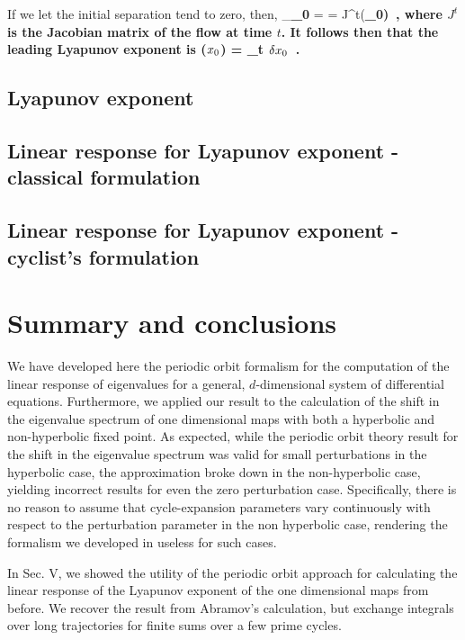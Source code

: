 \documentclass[aps,pre,
                showpacs,
                twocolumn,
                groupedaddress,
                superscriptaddress,
                floatfix]{revtex4-1}
\begin{document}
If we let the initial separation tend to zero, then,
\beq
\lim_{\bf \delta \ssp_{0} } 
= 
= J^{t}(\bf \ssp_{0})
\,,
\eeq
where $J^{t}$ is the Jacobian matrix of the flow at time $t$. It follows
then that the leading Lyapunov exponent is
\beq
\lambda(\textbf{$\ssp_{0}$})
= \lim_{t\rightarrow \infty}
\ln {}
         {\Vert \textbf{$\delta \ssp_{0}$} \Vert}
\,.
\eeq

\subsection{Lyapunov exponent }

\subsection{Linear response for Lyapunov exponent - classical formulation}
\label{sect:LinrespLyapClass}

\subsection{Linear response for Lyapunov exponent - cyclist's formulation}
\label{sect:LinrespLyapCycl}

\section{Summary and conclusions}
\label{sect:concl}

We have developed here the periodic orbit formalism for the computation of the
linear response of eigenvalues for a general, $d$-dimensional system of
differential equations. Furthermore, we applied our result to the
calculation of the shift in the eigenvalue spectrum of one dimensional
maps with both a hyperbolic and non-hyperbolic fixed point. As expected,
while the periodic orbit theory result for the shift in the eigenvalue
spectrum was valid for small perturbations in the hyperbolic case, the
approximation broke down in the non-hyperbolic case, yielding incorrect
results for even the zero perturbation case. Specifically, there is no
reason to assume that cycle-expansion parameters vary continuously with
respect to the perturbation parameter in the non hyperbolic case,
rendering the formalism we developed in  useless for such cases.

In Sec. V, we showed the utility of the periodic orbit approach for
calculating the linear response of the Lyapunov exponent of the one
dimensional maps from before. We recover the result from Abramov's
calculation, but exchange integrals over long trajectories for finite
sums over a few prime cycles.
\end{document}
